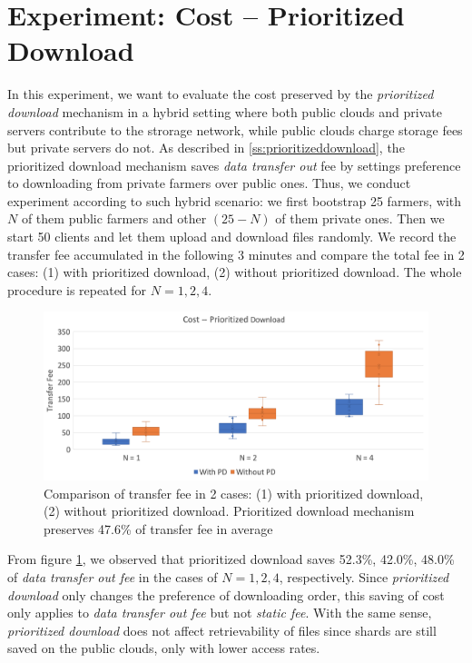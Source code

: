 \section{Experiment: Cost -- Prioritized Download}
\label{s:expcostprioritizeddownload}

In this experiment, we want to evaluate the cost preserved by the \textit{prioritized download} mechanism in a hybrid setting where both public clouds and private servers contribute to the strorage network, while public clouds charge storage fees but private servers do not. As described in \ref{ss:prioritizeddownload}, the prioritized download mechanism saves \textit{data transfer out} fee by settings preference to downloading from private farmers over public ones. Thus, we conduct experiment according to such hybrid scenario: we first bootstrap 25 farmers, with $N$ of them public farmers and other $(25-N)$ of them private ones.  Then we start 50 clients and let them upload and download files randomly. We record the transfer fee accumulated in the following 3 minutes and compare the total fee in 2 cases: (1) with prioritized download, (2) without prioritized download. The whole procedure is repeated for $N = 1, 2, 4$.

\begin{figure}[hbt]
  \centering
    \includegraphics[width=14cm]{charts/chart_cost_prioritized_download.png}
    \caption[Comparison of transfer fee in 2 cases: (1) with prioritized download, (2) without prioritized download]{Comparison of transfer fee in 2 cases: (1) with prioritized download, (2) without prioritized download. Prioritized download mechanism preserves 47.6\% of transfer fee in average}
    \label{fig:costprioritizeddownload}
\end{figure}

From figure \ref{fig:costprioritizeddownload}, we observed that prioritized download saves 52.3\%, 42.0\%, 48.0\% of \textit{data transfer out fee} in the cases of $N = 1, 2, 4$, respectively. Since \textit{prioritized download} only changes the preference of downloading order, this saving of cost only applies to \textit{data transfer out fee} but not \textit{static fee}. With the same sense, \textit{prioritized download} does not affect retrievability of files since shards are still saved on the public clouds, only with lower access rates.



  